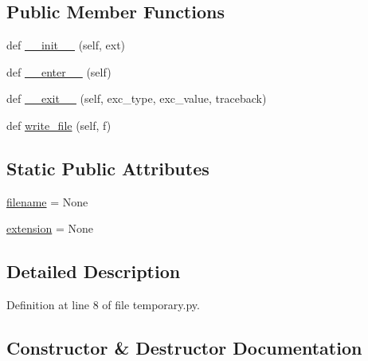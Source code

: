 \subsection*{Public Member Functions}
\begin{DoxyCompactItemize}
\item 
def \hyperlink{classpylib_1_1temporary_1_1temporary__file_a2fa7c4673cadc067ade6f5a62e73bbfe}{\+\_\+\+\_\+init\+\_\+\+\_\+} (self, ext)
\item 
def \hyperlink{classpylib_1_1temporary_1_1temporary__file_af8cc5acb89454c03b51f9918fa3aa069}{\+\_\+\+\_\+enter\+\_\+\+\_\+} (self)
\item 
def \hyperlink{classpylib_1_1temporary_1_1temporary__file_afd2465f566361a8b2bba1a2943023704}{\+\_\+\+\_\+exit\+\_\+\+\_\+} (self, exc\+\_\+type, exc\+\_\+value, traceback)
\item 
def \hyperlink{classpylib_1_1temporary_1_1temporary__file_a198ec454a96e1dd392bc3eaa99ee0a8c}{write\+\_\+file} (self, f)
\end{DoxyCompactItemize}
\subsection*{Static Public Attributes}
\begin{DoxyCompactItemize}
\item 
\hyperlink{classpylib_1_1temporary_1_1temporary__file_aed23d05f04833724e81e41d80363a65c}{filename} = None
\item 
\hyperlink{classpylib_1_1temporary_1_1temporary__file_a4662cc55e879791c5931ab72ad40eed3}{extension} = None
\end{DoxyCompactItemize}


\subsection{Detailed Description}


Definition at line 8 of file temporary.\+py.



\subsection{Constructor \& Destructor Documentation}
